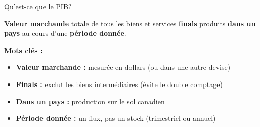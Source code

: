 \documentclass[aspectratio=169]{beamer}
\begin{document}
\begin{frame}{Qu'est-ce que le PIB?}
   \begin{defbox}
      \textbf{Valeur marchande} totale de tous les biens et services \textbf{finals} produits \textbf{dans un pays} au cours d'une \textbf{p\'eriode donn\'ee}.
   \end{defbox}
   \vspace{0.3cm}
   \textbf{Mots cl\'es :}
   \vspace{0.15cm}
   \begin{itemize}
      \setlength\itemsep{0.15cm}
      \item \textbf{Valeur marchande :} mesur\'ee en dollars (ou dans une autre devise)
      \item \textbf{Finals :} exclut les biens interm\'ediaires (\'evite le double comptage)
      \item \textbf{Dans un pays :} production sur le sol canadien
      \item \textbf{P\'eriode donn\'ee :} un flux, pas un stock (trimestriel ou annuel)
   \end{itemize}
\end{frame}
\end{document}
